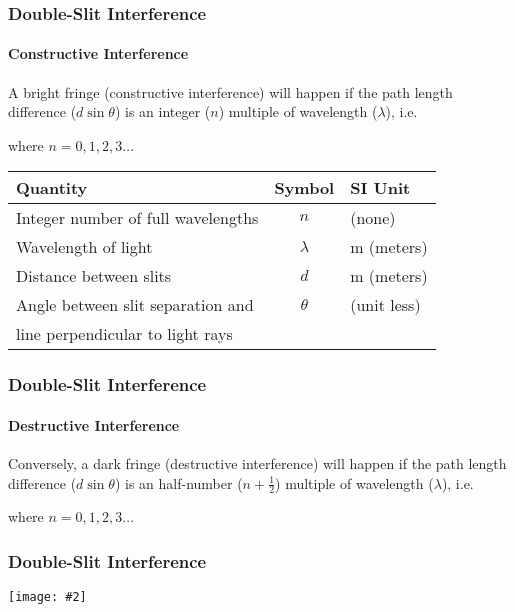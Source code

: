 \documentclass[compress,aspectratio=169]{beamer}
\newcommand{\pic}[2]{\texttt{[image: \#2]}}
\newcommand{\eq}[2]{\vspace{#1}{\LARGE\begin{displaymath}#2\end{displaymath}}}
\begin{document}
\begin{frame}
  \frametitle{Double-Slit Interference}
  \framesubtitle{Constructive Interference}
  A bright fringe (constructive interference) will happen if the path length
  difference ($d\sin\theta$) is an integer ($n$) multiple of wavelength
  ($\lambda$), i.e.
  
  \eq{-.2in}{
    \boxed{\pm n\lambda = d\sin\theta_n}
  } 

  \vspace{-.1in}where $n=0,1,2,3\ldots$
  
  \begin{center}
    \begin{tabular}{l|c|l}
      \rowcolor{pink}
      \textbf{Quantity} & \textbf{Symbol} & \textbf{SI Unit} \\ \hline
      Integer number of full wavelengths & $n$       & (none)\\
      Wavelength of light                & $\lambda$ & \si{\metre} (meters)\\
      Distance between slits             & $d$       & \si{\metre} (meters)\\
      Angle between slit separation and  & $\theta$  & (unit less)\\
      line perpendicular to light rays   & &\\
    \end{tabular}
  \end{center}
\end{frame}


\begin{frame}
  \frametitle{Double-Slit Interference}
  \framesubtitle{Destructive Interference}
  Conversely, a dark fringe (destructive interference) will happen if the path
  length difference ($d\sin\theta$) is an half-number ($n+\frac{1}{2}$)
  multiple of wavelength ($\lambda$), i.e.
  
  \eq{-0.2in}{
    \boxed{\pm\left(n+\frac{1}{2}\right)\lambda = d\sin\theta_n}
  }
  where $n=0,1,2,3\ldots$

\end{frame}



\begin{frame}
  \frametitle{Double-Slit Interference}
  \begin{center}
    \pic{0.65}{graphics/path-difference.png}
  \end{center}
\end{frame}
\end{document}
